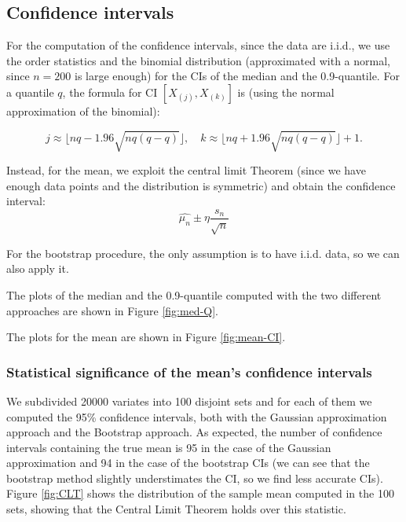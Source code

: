 \documentclass[a4paper,12pt]{article}
\begin{document}
\subsection*{Confidence intervals}
For the computation of the confidence intervals, since the data are i.i.d., we use the order statistics and the binomial distribution (approximated with a normal, since $n=200$ is large enough) for the CIs of the median and the 0.9-quantile.
For a quantile $q$, the formula for CI $[X_{(j)},X_{(k)}]$ is (using the normal approximation of the binomial):

\begin{equation*}
    j \approx \lfloor nq-1.96\sqrt{nq(q-q)} \rfloor, \quad k \approx \lfloor nq+1.96\sqrt{nq(q-q)} \rfloor +1.
\end{equation*}

Instead, for the mean, we exploit the central limit Theorem (since we have enough data points and the distribution is symmetric) and obtain the confidence interval:
\begin{equation*}
    \hat{\mu_n} \pm \eta\frac{s_n}{\sqrt{n}}
\end{equation*}


For the bootstrap procedure, the only assumption is to have i.i.d. data, so we can also apply it.

The plots of the median and the 0.9-quantile computed with the two different approaches are shown in Figure \ref{fig:med-Q}.

The plots for the mean are shown in Figure \ref{fig:mean-CI}.

\subsubsection*{Statistical significance of the mean's confidence intervals}

We subdivided 20000 variates into 100 disjoint sets and for each of them we computed the 95\% confidence intervals, both with the Gaussian approximation approach and the Bootstrap approach. As expected, the number of confidence intervals containing the true mean is 95 in the case of the Gaussian approximation and 94 in the case of the bootstrap CIs (we can see that the bootstrap method slightly understimates the CI, so we find less accurate CIs). Figure \ref{fig:CLT} shows the distribution of the sample mean computed in the 100 sets, showing that the Central Limit Theorem holds over this statistic.
\end{document}
